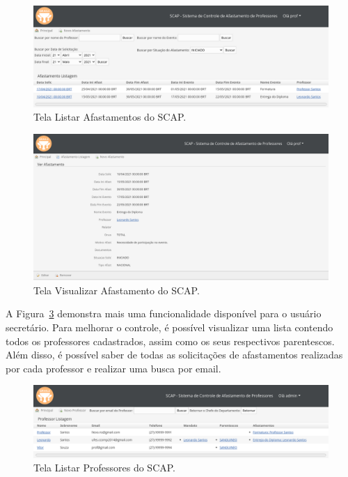 \begin{figure}[!h]
	\centering
	\includegraphics[scale=0.33]{figuras/fig-projeto-listar-afastamentos} 
	\caption{Tela Listar Afastamentos do SCAP.}
	\label{fig-projeto-listar-afastamentos}
\end{figure}

\begin{figure}[!h]
	\centering
	\includegraphics[scale=0.33]{figuras/fig-projeto-ver-afastamento} 
	\caption{Tela Visualizar Afastamento do SCAP.}
	\label{fig-projeto-ver-afastamento}
\end{figure}

A Figura~\ref{fig-projeto-listar-professores} demonstra mais uma funcionalidade disponível para o usuário secretário. Para melhorar o controle, é possível visualizar uma lista contendo todos os professores cadastrados, assim como os seus respectivos parentescos. Além disso, é possível saber de todas as solicitações de afastamentos realizadas por cada professor e realizar uma busca por email.  

\begin{figure}[!h]
	\centering
	\includegraphics[scale=0.33]{figuras/fig-projeto-listar-professores} 
	\caption{Tela Listar Professores do SCAP.}
	\label{fig-projeto-listar-professores}
\end{figure}

